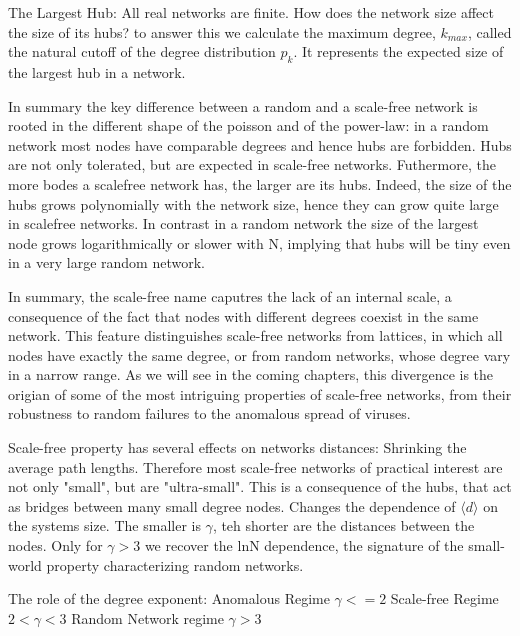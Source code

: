 The Largest Hub: 
    All real networks are finite. 
    How does the network size affect the size of its hubs?
        to answer this we calculate the maximum degree, $k_{max}$, called the natural cutoff of the degree distribution $p_k$. It represents the expected size of the largest hub in a network. 
        
    In summary the key difference between a random and a scale-free network is rooted in the different shape of the poisson and of the power-law: in a random network most nodes have comparable degrees and hence hubs are forbidden. Hubs are not only tolerated, but are expected in scale-free networks. Futhermore, the more bodes a scalefree network has, the larger are its hubs. Indeed, the size of the hubs grows polynomially with the network size, hence they can grow quite large in scalefree networks. In contrast in a random network the size of the largest node grows logarithmically or slower with N, implying that hubs will be tiny even in a very large random network. 
    
    In summary, the scale-free name caputres the lack of an internal scale, a consequence of the fact that nodes with different degrees coexist in the same network. This feature distinguishes scale-free networks from lattices, in which all nodes have exactly the same degree, or from random networks, whose degree vary in a narrow range. As we will see in the coming chapters, this divergence is the origian of some of the most intriguing properties of scale-free networks, from their robustness to random failures to the anomalous spread of viruses. 
    
Scale-free property has several effects on networks distances: 
    Shrinking the average path lengths. Therefore most scale-free networks of practical interest are not only "small", but are "ultra-small". This is a consequence of the hubs, that act as bridges between many small degree nodes. 
    Changes the dependence of $\langle d \rangle$ on the systems size. The smaller is $\gamma$, teh shorter are the distances between the nodes. 
    Only for $\gamma> 3$ we recover the lnN dependence, the signature of the small-world property characterizing random networks. 
    
The role of the degree exponent: 
Anomalous Regime $\gamma<= 2$
Scale-free Regime $ 2< \gamma< 3$
Random Network regime  $\gamma>3$